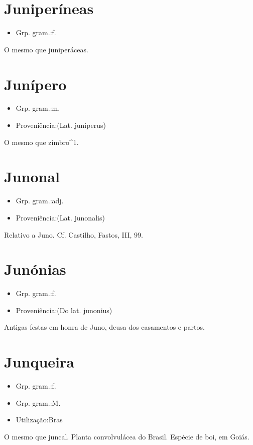\documentclass{article}
\begin{document}
\section{Juniperíneas}
\begin{itemize}
\item {Grp. gram.:f.}
\end{itemize}
O mesmo que \textunderscore juniperáceas\textunderscore .
\section{Junípero}
\begin{itemize}
\item {Grp. gram.:m.}
\end{itemize}
\begin{itemize}
\item {Proveniência:(Lat. \textunderscore juniperus\textunderscore )}
\end{itemize}
O mesmo que \textunderscore zimbro\textunderscore ^1.
\section{Junonal}
\begin{itemize}
\item {Grp. gram.:adj.}
\end{itemize}
\begin{itemize}
\item {Proveniência:(Lat. \textunderscore junonalis\textunderscore )}
\end{itemize}
Relativo a Juno. Cf. Castilho, \textunderscore Fastos\textunderscore , III, 99.
\section{Junónias}
\begin{itemize}
\item {Grp. gram.:f.}
\end{itemize}
\begin{itemize}
\item {Proveniência:(Do lat. \textunderscore junonius\textunderscore )}
\end{itemize}
Antigas festas em honra de Juno, deusa dos casamentos e partos.
\section{Junqueira}
\begin{itemize}
\item {Grp. gram.:f.}
\end{itemize}
\begin{itemize}
\item {Grp. gram.:M.}
\end{itemize}
\begin{itemize}
\item {Utilização:Bras}
\end{itemize}
O mesmo que \textunderscore juncal\textunderscore .
Planta convolvulácea do Brasil.
Espécie de boi, em Goiás.
\end{document}
